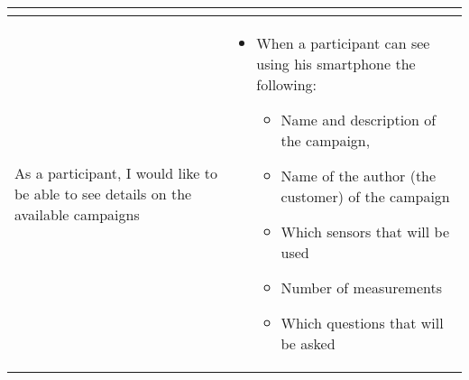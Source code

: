 \begin{center}
\begin{longtable}{| m{} | m{} |}
\begin{itemize}[noitemsep,topsep=0pt,parsep=0pt,partopsep=0pt]
	\end{itemize} \\ \hline
	As a participant, I would like to be able to see details on the available campaigns &
	\begin{itemize}[noitemsep,topsep=0pt,parsep=0pt,partopsep=0pt]
		\item When a participant can see using his smartphone the following:
		\begin{itemize}[noitemsep,topsep=0pt,parsep=0pt,partopsep=0pt]
			\item Name and description of the campaign, 
			\item Name of the author (the customer) of the campaign
			\item Which sensors that will be used
			\item Number of measurements
			\item Which questions that will be asked
		\end{itemize}
	\end{itemize} \\ \hline


\end{longtable}
\end{center}
